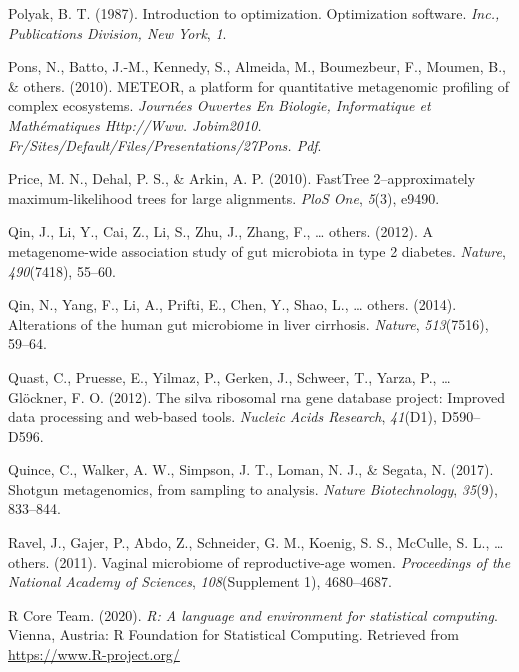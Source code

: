 \documentclass[12pt,a4paper]{reedthesis}
\theoremstyle{definition}
\theoremstyle{definition}
\theoremstyle{definition}
\theoremstyle{remark}
\begin{document}
\leavevmode\hypertarget{ref-polyak1987introduction}{}%
Polyak, B. T. (1987). Introduction to optimization. Optimization software. \emph{Inc., Publications Division, New York}, \emph{1}.

\leavevmode\hypertarget{ref-pons2010meteor}{}%
Pons, N., Batto, J.-M., Kennedy, S., Almeida, M., Boumezbeur, F., Moumen, B., \& others. (2010). METEOR, a platform for quantitative metagenomic profiling of complex ecosystems. \emph{Journées Ouvertes En Biologie, Informatique et Mathématiques Http://Www. Jobim2010. Fr/Sites/Default/Files/Presentations/27Pons. Pdf}.

\leavevmode\hypertarget{ref-price2010fasttree}{}%
Price, M. N., Dehal, P. S., \& Arkin, A. P. (2010). FastTree 2--approximately maximum-likelihood trees for large alignments. \emph{PloS One}, \emph{5}(3), e9490.

\leavevmode\hypertarget{ref-qin2012metagenome}{}%
Qin, J., Li, Y., Cai, Z., Li, S., Zhu, J., Zhang, F., \ldots{} others. (2012). A metagenome-wide association study of gut microbiota in type 2 diabetes. \emph{Nature}, \emph{490}(7418), 55--60.

\leavevmode\hypertarget{ref-qin2014alterations}{}%
Qin, N., Yang, F., Li, A., Prifti, E., Chen, Y., Shao, L., \ldots{} others. (2014). Alterations of the human gut microbiome in liver cirrhosis. \emph{Nature}, \emph{513}(7516), 59--64.

\leavevmode\hypertarget{ref-quast2012silva}{}%
Quast, C., Pruesse, E., Yilmaz, P., Gerken, J., Schweer, T., Yarza, P., \ldots{} Glöckner, F. O. (2012). The silva ribosomal rna gene database project: Improved data processing and web-based tools. \emph{Nucleic Acids Research}, \emph{41}(D1), D590--D596.

\leavevmode\hypertarget{ref-quince2017shotgun}{}%
Quince, C., Walker, A. W., Simpson, J. T., Loman, N. J., \& Segata, N. (2017). Shotgun metagenomics, from sampling to analysis. \emph{Nature Biotechnology}, \emph{35}(9), 833--844.

\leavevmode\hypertarget{ref-ravel2011vaginal}{}%
Ravel, J., Gajer, P., Abdo, Z., Schneider, G. M., Koenig, S. S., McCulle, S. L., \ldots{} others. (2011). Vaginal microbiome of reproductive-age women. \emph{Proceedings of the National Academy of Sciences}, \emph{108}(Supplement 1), 4680--4687.

\leavevmode\hypertarget{ref-r2020}{}%
R Core Team. (2020). \emph{R: A language and environment for statistical computing}. Vienna, Austria: R Foundation for Statistical Computing. Retrieved from \url{https://www.R-project.org/}
\end{document}
